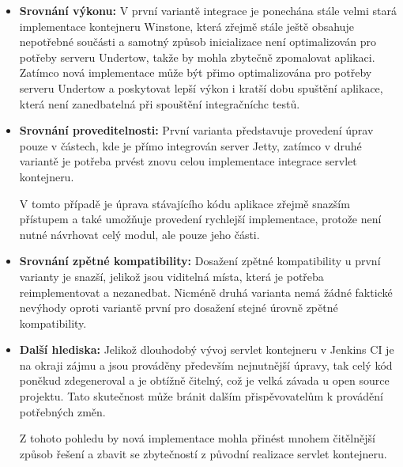             \begin{itemize}
                \item{\textbf{Srovnání výkonu:} V první variantě integrace je ponechána stále
                 velmi stará implementace kontejneru Winstone, která zřejmě stále ještě
                 obsahuje nepotřebné součásti a samotný způsob inicializace není optimalizován
                 pro potřeby serveru Undertow, takže by mohla zbytečně zpomalovat aplikaci.
                 Zatímco nová implementace může být přimo optimalizována pro potřeby 
                 serveru Undertow a poskytovat lepší výkon i kratší dobu spuštění aplikace, 
                 která není zanedbatelná při spouštění integračníchc testů.}

                \item{\textbf{Srovnání proveditelnosti:} První varianta představuje provedení 
                    úprav pouze v částech, kde je přímo integrován server Jetty, 
                    zatímco v druhé variantě je potřeba prvést znovu celou implementace
                    integrace servlet kontejneru. 
                                         
                    V tomto případě je úprava stávajícího kódu aplikace
                    zřejmě snazším přístupem a také umožňuje provedení rychlejší
                    implementace, protože není nutné návrhovat celý modul,
                    ale pouze jeho části.}

                \item{\textbf{Srovnání zpětné kompatibility:} Dosažení zpětné kompatibility
                    u první varianty je snazší, jelikož jsou viditelná místa, která je 
                    potřeba reimplementovat a nezanedbat. Nicméně druhá varianta
                    nemá žádné faktické nevýhody oproti variantě první pro dosažení
                    stejné úrovně zpětné kompatibility.}

                \item{\textbf{Další hlediska:} Jelikož dlouhodobý vývoj servlet kontejneru
                    v Jenkins CI je na okraji zájmu a jsou prováděny především nejnutnější úpravy, 
                    tak celý kód poněkud zdegeneroval a je obtížně čitelný, což
                    je velká závada u open source projektu. Tato skutečnost
                    může bránit dalším přispěvovatelům k provádění potřebných změn.

                    Z tohoto pohledu by nová implementace mohla přinést mnohem čitělnější
                    způsob řešení a zbavit se zbytečností z původní realizace servlet kontejneru.}
            \end{itemize}


